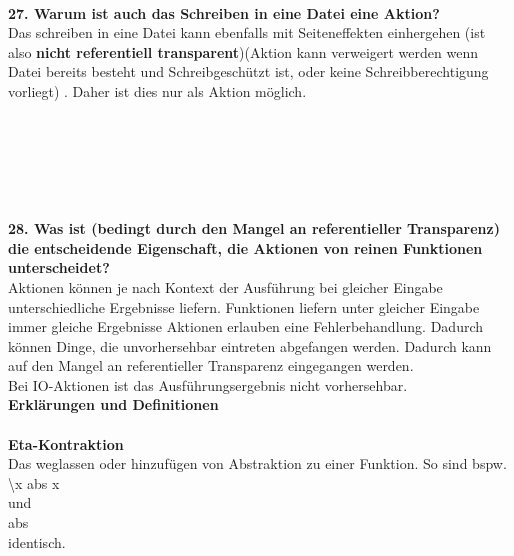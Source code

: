\documentclass{article}
\begin{document}
\\
\textbf{27. Warum ist auch das Schreiben in eine Datei eine Aktion?}
\\
Das schreiben in eine Datei kann ebenfalls mit Seiteneffekten einhergehen (ist also \textbf{nicht referentiell transparent})(Aktion kann verweigert werden wenn Datei bereits besteht und Schreibgesch\"utzt ist, oder keine Schreibberechtigung vorliegt)%
. Daher ist dies nur als Aktion möglich.\\
\\
\\
\\
\\
\\
\\
\textbf{28. Was ist (bedingt durch den Mangel an referentieller Transparenz) die entscheidende Eigenschaft, die Aktionen von reinen Funktionen unterscheidet?}
\\
Aktionen k\"onnen je nach Kontext der Ausf\"uhrung bei gleicher Eingabe unterschiedliche Ergebnisse liefern. Funktionen liefern unter gleicher Eingabe immer gleiche Ergebnisse
Aktionen erlauben eine Fehlerbehandlung. Dadurch können Dinge, die unvorhersehbar eintreten abgefangen werden.  Dadurch kann auf den Mangel an referentieller Transparenz eingegangen werden.\\

Bei IO-Aktionen ist das Ausführungsergebnis nicht vorhersehbar.
\\
\textbf{Erklärungen und Definitionen}\\
\\
\textbf{Eta-Kontraktion}\\
Das weglassen oder hinzufügen von Abstraktion zu einer Funktion. So sind bspw. \\
\backslash x \rightarrow abs x\\
und\\
abs\\
identisch.
\\
\end{document}
